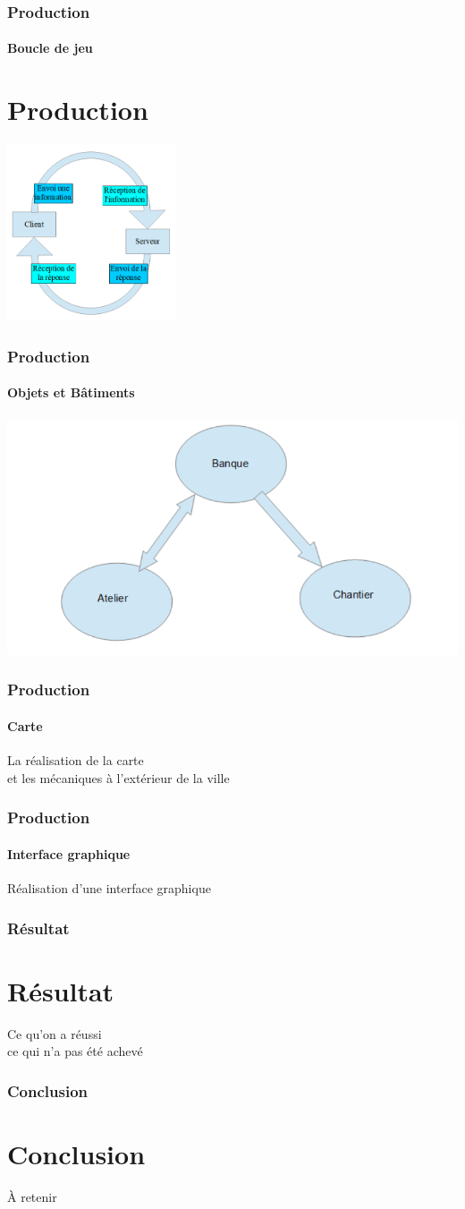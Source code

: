\documentclass{beamer}
\begin{document}
    
    \begin{frame}
        \frametitle{Production}
        \framesubtitle{Boucle de jeu}
        \section{Production}
        \includegraphics[width=5cm] {socket.PNG}
    \end{frame}
    
    
    \begin{frame}
        \frametitle{Production}
        \framesubtitle{Objets et Bâtiments}
        \includegraphics[width=\textwidth] {objet.PNG}
    \end{frame}
    
    
    \begin{frame}
        \frametitle{Production}
        \framesubtitle{Carte}
        La réalisation de la carte
        \\ et les mécaniques à l'extérieur de la ville
    \end{frame}
    
    
    \begin{frame}
        \frametitle{Production}
        \framesubtitle{Interface graphique}
        Réalisation d'une interface graphique
    \end{frame}
    
    
    \begin{frame}
        \frametitle{Résultat}
        \section{Résultat}
        Ce qu'on a réussi
        \\ ce qui n'a pas été achevé
    \end{frame}
    
    
    \begin{frame}
        \frametitle{Conclusion}
        \section{Conclusion}
        À retenir
    \end{frame}
    
\end{document}
